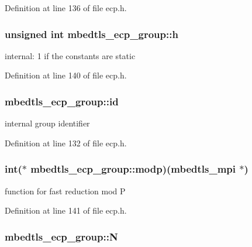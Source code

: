 Definition at line 136 of file ecp.\-h.

\hypertarget{structmbedtls__ecp__group_a3cc458ace9f663e7827a6c3556e75e64}{
\subsubsection[{h}]{\setlength{\rightskip}{0pt plus 5cm}unsigned int mbedtls\-\_\-ecp\-\_\-group\-::h}}\label{structmbedtls__ecp__group_a3cc458ace9f663e7827a6c3556e75e64}
internal\-: 1 if the constants are static 

Definition at line 140 of file ecp.\-h.

\hypertarget{structmbedtls__ecp__group_a3e572cd2e40e1c23fc9a7a6aef7122d6}{
\subsubsection[{id}]{ mbedtls\-\_\-ecp\-\_\-group\-::id}}\label{structmbedtls__ecp__group_a3e572cd2e40e1c23fc9a7a6aef7122d6}
internal group identifier 

Definition at line 132 of file ecp.\-h.

\hypertarget{structmbedtls__ecp__group_a3417a910c8ca2a3d5986f2a3cd4068d5}{
\subsubsection[{modp}]{\setlength{\rightskip}{0pt plus 5cm}int($\ast$ mbedtls\-\_\-ecp\-\_\-group\-::modp)({\bf mbedtls\-\_\-mpi} $\ast$)}}\label{structmbedtls__ecp__group_a3417a910c8ca2a3d5986f2a3cd4068d5}
function for fast reduction mod P 

Definition at line 141 of file ecp.\-h.

\hypertarget{structmbedtls__ecp__group_a7104724a939b7eef2ae3627db410e1e8}{
\subsubsection[{N}]{ mbedtls\-\_\-ecp\-\_\-group\-::\-N}}\label{structmbedtls__ecp__group_a7104724a939b7eef2ae3627db410e1e8}

